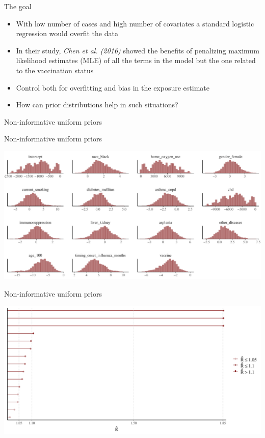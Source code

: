\documentclass[ignorenonframetext,a4paper]{beamer}
\begin{document}
\begin{frame}{The goal}

\begin{itemize}
\item
  With low number of cases and high number of covariates a standard
  logistic regression would overfit the data
\item
  In their study, \emph{Chen et al. (2016)} showed the benefits of
  penalizing maximum likelihood estimates (MLE) of all the terms in the
  model but the one related to the vaccination status
\item
  Control both for overfitting and bias in the exposure estimate
\item
  How can prior distributions help in such situations?
\end{itemize}

\end{frame}

\begin{frame}{Non-informative uniform priors}

\end{frame}

\begin{frame}{Non-informative uniform priors}

\includegraphics{DB_presentation_case_study_files/figure-beamer/unnamed-chunk-28-1.pdf}

\end{frame}

\begin{frame}{Non-informative uniform priors}

\includegraphics{DB_presentation_case_study_files/figure-beamer/unnamed-chunk-29-1.pdf}

\end{frame}
\end{document}
